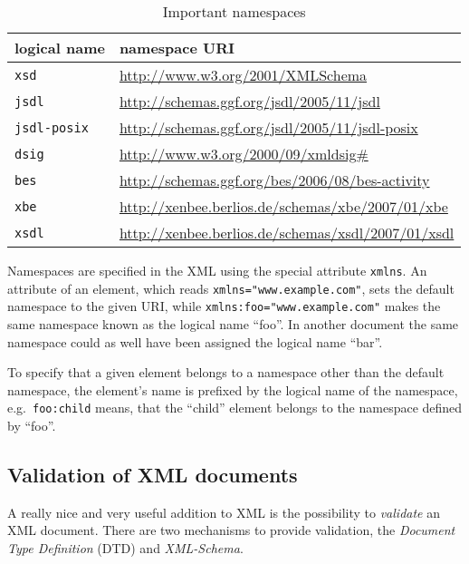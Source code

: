 \medskip

\begin{table}[h]
  \centering
  \begin{tabular}{@{}ll@{}}\toprule
    logical name        & \multicolumn{1}{l}{namespace URI} \\ \midrule %
    \texttt{xsd}        & \url{http://www.w3.org/2001/XMLSchema} \\
    \texttt{jsdl}       & \url{http://schemas.ggf.org/jsdl/2005/11/jsdl} \\
    \texttt{jsdl-posix} &  \url{http://schemas.ggf.org/jsdl/2005/11/jsdl-posix} \\
    \texttt{dsig}       & \url{http://www.w3.org/2000/09/xmldsig#} \\
    \texttt{bes}        & \url{http://schemas.ggf.org/bes/2006/08/bes-activity} \\
    \texttt{xbe}        & \url{http://xenbee.berlios.de/schemas/xbe/2007/01/xbe} \\
    \texttt{xsdl}       & \url{http://xenbee.berlios.de/schemas/xsdl/2007/01/xsdl} \\
    \bottomrule
  \end{tabular}
  \caption[XML Namespaces used in this work]{Important namespaces}
  \label{tab:namespaces}
\end{table}

Namespaces  are   specified  in  the  XML  using   the  special  attribute
\texttt{xmlns}.     An   attribute    of   an    element,    which   reads
\texttt{xmlns="www.example.com"}, sets the  default namespace to the given
URI, while  \texttt{xmlns:foo="www.example.com"} makes the  same namespace
known as the logical name  ``foo''. In another document the same namespace
could as well have been assigned the logical name ``bar''.

To specify  that a  given element  belongs to a  namespace other  than the
default namespace, the  element's name is prefixed by  the logical name of
the namespace,  e.g.~\texttt{foo:child} means, that  the ``child'' element
belongs to the namespace defined by ``foo''.

\subsection{Validation of XML documents}
\label{sec:xml-validation}

A  really nice  and very  useful  addition to  XML is  the possibility  to
\emph{validate}  an XML  document.  There  are two  mechanisms  to provide
validation,    the    \emph{Document    Type   Definition}    (DTD)    and
\emph{XML-Schema}.

